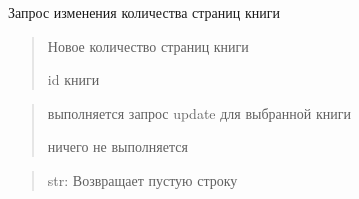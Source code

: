 \documentclass[letterpaper,10pt,russian]{sphinxmanual}
\begin{document}
\begin{fulllineitems}
\label{\detokenize{blueprints:blueprints.change_book_information.change_page}}
\pysigstartsignatures
{}
\pysigstopsignatures
\sphinxAtStartPar
Запрос изменения количества страниц книги
\begin{description}
\begin{quote}\begin{description}
\sphinxAtStartPar
Новое количество страниц книги

\sphinxAtStartPar
id книги

\end{description}\end{quote}

\begin{quote}\begin{description}
\sphinxAtStartPar
выполняется запрос update для выбранной книги

\sphinxAtStartPar
ничего не выполняется

\end{description}\end{quote}

\end{description}
\begin{quote}\begin{description}
\sphinxAtStartPar
str: Возвращает пустую строку

\end{description}\end{quote}

\end{fulllineitems}

\end{document}
